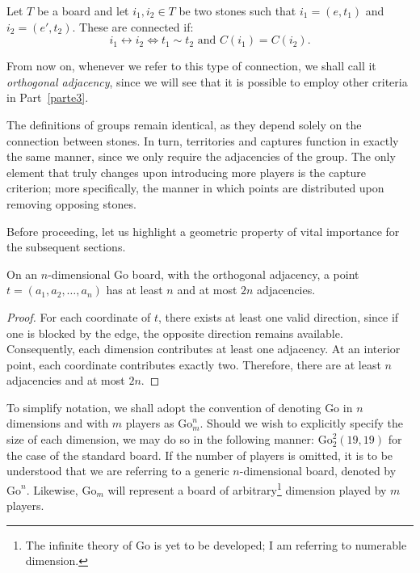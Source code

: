 \begin{definition}[Connection]
	Let $T$ be a board and let $i_1, i_2 \in T$ be two stones such that $i_1 = (e, t_1)$ and $i_2 = (e', t_2)$. These are connected if:
	$$i_1 \leftrightarrow i_2 \iff t_1 \sim t_2 \text{ and } C(i_1) = C(i_2).$$
\end{definition}
From now on, whenever we refer to this type of connection, we shall call it \textit{orthogonal adjacency}, since we will see that it is possible to employ other criteria in Part~\ref{parte3}.

The definitions of groups remain identical, as they depend solely on the connection between stones. In turn, territories and captures function in exactly the same manner, since we only require the adjacencies of the group. The only element that truly changes upon introducing more players is the capture criterion; more specifically, the manner in which points are distributed upon removing opposing stones.

Before proceeding, let us highlight a geometric property of vital importance for the subsequent sections.


\begin{lemma}\label{lem:2n}
	On an \(n\)-dimensional Go board, with the orthogonal adjacency, a point \(t=(a_1,a_2,\dots,a_n)\) has at least \(n\) and at most $2n$ adjacencies.
\end{lemma}


\begin{proof}
	For each coordinate of \(t\), there exists at least one valid direction, since if one is blocked by the edge, the opposite direction remains available. Consequently, each dimension contributes at least one adjacency. At an interior point, each coordinate contributes exactly two. Therefore, there are at least \(n\) adjacencies and at most $2n$.
\end{proof}

To simplify notation, we shall adopt the convention of denoting Go in \(n\) dimensions and with \(m\) players as \(\mathrm{Go}^n_m\). Should we wish to explicitly specify the size of each dimension, we may do so in the following manner: \(\mathrm{Go}^2_2(19,19)\) for the case of the standard board. If the number of players is omitted, it is to be understood that we are referring to a generic \(n\)-dimensional board, denoted by \(\mathrm{Go}^n\). Likewise, \(\mathrm{Go}_m\) will represent a board of arbitrary\footnote{The infinite theory of Go is yet to be developed; I am referring to numerable dimension.} dimension played by \(m\) players.

